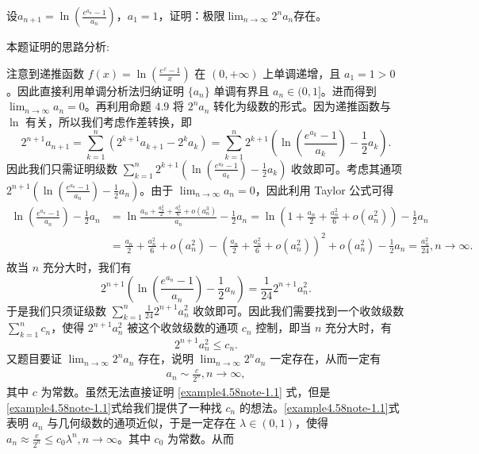 \documentclass[lang=cn,newtx,10pt,scheme=chinese]{elegantbook}
\begin{document}
\begin{example}
设\(a_{n + 1}=\ln\left(\frac{e^{a_n}-1}{a_n}\right)\)，\(a_1 = 1\)，证明：极限\(\lim_{n\rightarrow\infty}2^na_n\)存在。
\end{example}
\begin{note}
本题证明的思路分析:

注意到递推函数 \(f(x)=\ln\left(\frac{e^x - 1}{x}\right)\) 在 \((0, +\infty)\) 上单调递增，且 \(a_1 = 1>0\)。因此直接利用单调分析法归纳证明 \(\{ a_n \}\) 单调有界且 \(a_n\in(0, 1]\)。进而得到 \(\lim_{n \to \infty} a_n = 0\)。再利用命题 \(4.9\) 将 \(2^n a_n\) 转化为级数的形式。因为递推函数与 \(\ln\) 有关，所以我们考虑作差转换，即
\[
2^{n + 1} a_{n + 1} = \sum_{k = 1}^n (2^{k + 1} a_{k + 1} - 2^k a_k) = \sum_{k = 1}^n 2^{k + 1}\left(\ln\left(\frac{e^{a_k} - 1}{a_k}\right) - \frac{1}{2} a_k\right).
\]
因此我们只需证明级数 \(\sum_{k = 1}^n 2^{k + 1}\left(\ln\left(\frac{e^{a_k} - 1}{a_k}\right) - \frac{1}{2} a_k\right)\) 收敛即可。考虑其通项 \(2^{n + 1}\left(\ln\left(\frac{e^{a_n} - 1}{a_n}\right) - \frac{1}{2} a_n\right)\)。由于 \(\lim_{n \to \infty} a_n = 0\)，因此利用 Taylor 公式可得
\begin{align*}
\ln\left(\frac{e^{a_n} - 1}{a_n}\right) - \frac{1}{2} a_n &= \ln\frac{a_n+\frac{a_n^2}{2}+\frac{a_n^3}{6}+o(a_n^3)}{a_n} - \frac{1}{2} a_n
= \ln\left(1 + \frac{a_n}{2}+\frac{a_n^2}{6}+o(a_n^2)\right) - \frac{1}{2} a_n\\
&= \frac{a_n}{2}+\frac{a_n^2}{6}+o(a_n^2) - \left(\frac{a_n}{2}+\frac{a_n^2}{6}+o(a_n^2)\right)^2 + o(a_n^2) - \frac{1}{2} a_n
= \frac{a_n^2}{24}, n \to \infty.
\end{align*}
故当 \(n\) 充分大时，我们有
\[
2^{n + 1}\left(\ln\left(\frac{e^{a_n} - 1}{a_n}\right) - \frac{1}{2} a_n\right) = \frac{1}{24} 2^{n + 1} a_n^2.
\]
于是我们只须证级数 \(\sum_{k = 1}^n \frac{1}{24} 2^{n + 1} a_n^2\) 收敛即可。因此我们需要找到一个收敛级数 \(\sum_{k = 1}^n c_n\)，使得 \(2^{n + 1} a_n^2\) 被这个收敛级数的通项 \(c_n\) 控制，即当 \(n\) 充分大时，有
\[
2^{n + 1} a_n^2 \leq c_n.
\]
又题目要证 \(\lim_{n \to \infty} 2^n a_n\) 存在，说明 \(\lim_{n \to \infty} 2^n a_n\) 一定存在，从而一定有
\begin{align}
a_n \sim \frac{c}{2^n}, n \to \infty, \label{example4.58note-1.1}
\end{align}
其中 \(c\) 为常数。虽然无法直接证明 \eqref{example4.58note-1.1} 式，但是 \eqref{example4.58note-1.1}式给我们提供了一种找 \(c_n\) 的想法。\eqref{example4.58note-1.1}式表明 \(a_n\) 与几何级数的通项近似，于是一定存在 \(\lambda \in (0, 1)\)，使得 \(a_n \approx \frac{c}{2^n} \leq c_0 \lambda ^n, n \to \infty\)。其中 \(c_0\) 为常数。从而

\end{note}
\end{document}
